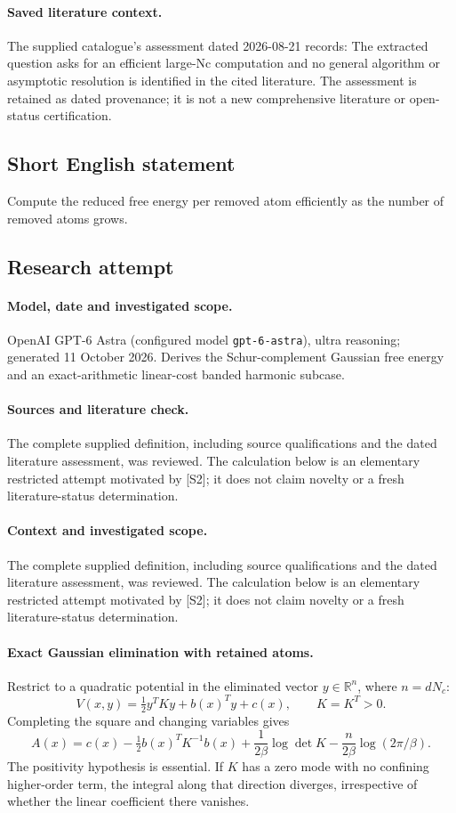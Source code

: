\documentclass[11pt]{article}
\begin{document}
\paragraph{Saved literature context.} The supplied catalogue's assessment dated 2026-08-21 records: The extracted question asks for an efficient large-Nc computation and no general algorithm or asymptotic resolution is identified in the cited literature. The assessment is retained as dated provenance; it is not a new comprehensive literature or open-status certification.
\subsection{Short English statement}
Compute the reduced free energy per removed atom efficiently as the number of removed atoms grows.
\subsection{Research attempt}
\paragraph{Model, date and investigated scope.}
OpenAI GPT-6 Astra (configured model \texttt{gpt-6-astra}), ultra reasoning; generated 11 October 2026. Derives the Schur-complement Gaussian free energy and an exact-arithmetic linear-cost banded harmonic subcase.

\paragraph{Sources and literature check.}
The complete supplied definition, including source qualifications and the dated literature assessment, was reviewed. The calculation below is an elementary restricted attempt motivated by [S2]; it does not claim novelty or a fresh literature-status determination.

\paragraph{Context and investigated scope.} The complete supplied definition, including source qualifications and the dated literature assessment, was reviewed. The calculation below is an elementary restricted attempt motivated by [S2]; it does not claim novelty or a fresh literature-status determination.

\paragraph{Exact Gaussian elimination with retained atoms.} Restrict to a quadratic potential in the eliminated vector $y\in\mathbb R^n$, where $n=dN_c$:
\[
 V(x,y)=\tfrac12y^TKy+b(x)^Ty+c(x),\qquad K=K^T>0.
\]
Completing the square and changing variables gives
\[
 A(x)=c(x)-\tfrac12b(x)^TK^{-1}b(x)
 +\frac1{2\beta}\log\det K-\frac n{2\beta}\log(2\pi/\beta).
\]
The positivity hypothesis is essential. If $K$ has a zero mode with no confining higher-order term, the integral along that direction diverges, irrespective of whether the linear coefficient there vanishes.
\end{document}
